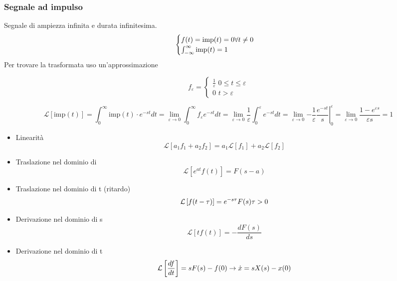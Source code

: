 	\subsubsection{Segnale ad impulso}
	Segnale di ampiezza infinita e durata infinitesima.
	\begin{equation*}
		\begin{cases}
			f(t) = \text{imp}(t) = 0 \space \forall t\not= 0\\
			\int_{-\infty}^{\infty} \text{imp}(t) = 1
		\end{cases}
	\end{equation*}
	Per trovare la trasformata uso un'approssimazione
	\begin{figure}[H]
		\begin{minipage}{.5\linewidth}
		\end{minipage}%
		\begin{minipage}{.5\linewidth}
			\[f_\varepsilon = \begin{cases}
				\frac{1}{\varepsilon} \,\, 0\leq t\leq \varepsilon\\
				0 \,\, t>\varepsilon
			\end{cases}\]
		\end{minipage}
		\[\mathcal{L}[\text{imp}(t)] = \int_{0}^{\infty} \text{imp}(t)\cdot e^{-st}dt =\lim_{\varepsilon\to0}\int_{0}^{\infty}f_\varepsilon e^{-st}dt = 
		\lim_{\varepsilon\to0}\frac{1}{\varepsilon}\int_{0}^{\varepsilon}e^{-st}dt = \lim_{\varepsilon\to0} \left.-\frac{1}{\varepsilon}\frac{e^{-st}}{s}\right|_0^\varepsilon = \lim_{\varepsilon\to0} \frac{1-e^{\varepsilon s}}{\varepsilon s} = 1 \]
	\end{figure}
	\begin{itemize}
		\item Linearità
		\[\mathcal{L}\left[a_1f_1+a_2f_2\right] = a_1\mathcal{L}[f_1] + a_2\mathcal{L}[f_2]\]
		\item Traslazione nel dominio di 
		\[\mathcal{L}\left[e^{at}f(t)\right] = F(s-a)\]
		\item Traslazione nel dominio di t (ritardo)
		\[\mathcal{L}\left[f(t-\tau)\right] = e^{-s\tau}F(s) \space \tau>0\]
		\item Derivazione nel dominio di s
		\[\mathcal{L}\left[tf(t)\right] = -\frac{dF(s)}{ds}\]
		\item Derivazione nel dominio di t
		\[\mathcal{L}\left[\frac{df}{dt}\right] = sF(s) - f(0)\space \to \dot{x} = sX(s) -x(0)\]
	\end{itemize}
